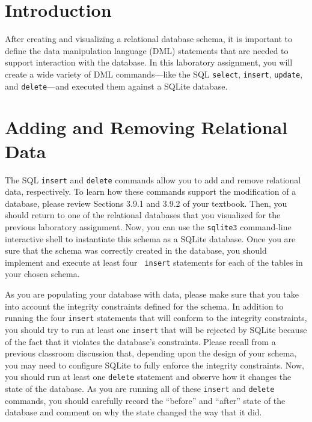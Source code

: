 


\usepackage[compact]{titlesec}



\section*{Introduction}

After creating and visualizing a relational database schema, it is important to define the data manipulation language
(DML) statements that are needed to support interaction with the database.  In this laboratory assignment, you will create
a wide variety of DML commands---like the SQL {\tt select}, {\tt insert}, {\tt update}, and {\tt delete}---and executed
them against a SQLite database.

\vspace*{-.05in}
\section*{Adding and Removing Relational Data}

The SQL {\tt insert} and {\tt delete} commands allow you to add and remove relational data, respectively. To learn how
these commands support the modification of a database, please review Sections 3.9.1 and 3.9.2 of your textbook.  Then,
you should return to one of the relational databases that you visualized for the previous laboratory assignment. Now, you
can use the {\tt sqlite3} command-line interactive shell to instantiate this schema as a SQLite database.
Once you are sure that the schema was correctly created in the database, you should implement and execute at least four {\tt
insert} statements for each of the tables in your chosen schema.  

As you are populating your database with data, please make sure that you take into account the integrity constraints
defined for the schema. In addition to running the four {\tt insert} statements that will conform to the integrity
constraints, you should try to run at least one {\tt insert} that will be rejected by SQLite because of the fact that it
violates the database's constraints. Please recall from a previous classroom discussion that, depending upon the design
of your schema,  you may need to configure SQLite to fully enforce the integrity constraints. Now, you should run at
least one {\tt delete} statement and observe how it changes the state of the database. As you are running all of these
{\tt insert} and {\tt delete} commands, you should carefully record the ``before'' and ``after'' state of the database
and comment on why the state changed the way that it did. 

